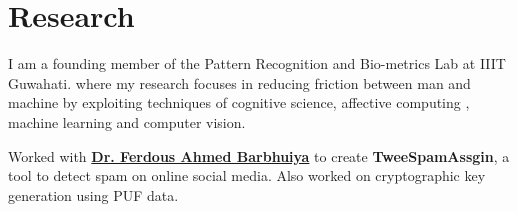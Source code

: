 
\section{Research}
I am a founding member of the Pattern Recognition and Bio-metrics Lab at IIIT Guwahati. where my research focuses in reducing friction between man and machine by exploiting techniques of cognitive science, affective computing , machine learning and computer vision.
\sectionsep

Worked with \textbf{\href{http://www.iiitg.ac.in}{Dr. Ferdous Ahmed Barbhuiya}} to create \textbf{TweeSpamAssgin}, a tool to detect spam on online social media. Also worked on cryptographic key generation using PUF data.
\sectionsep